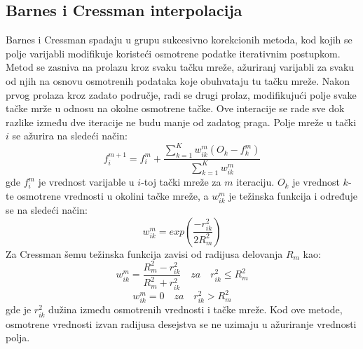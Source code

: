 \documentclass[12pt]{article}
\begin{document}
 
\subsection{Barnes i Cressman interpolacija}
Barnes i Cressman spadaju u grupu sukcesivno korekcionih metoda, kod kojih se polje varijabli modifikuje koristeći osmotrene podatke iterativnim postupkom. Metod se zasniva na prolazu kroz svaku tačku mreže, ažuriranj varijabli za svaku od njih na osnovu osmotrenih podataka koje obuhvataju tu tačku mreže. Nakon prvog prolaza kroz zadato područje, radi se drugi prolaz, modifikujući polje svake tačke mrže u odnosu na okolne osmotrene tačke. Ove interacije se rade sve dok razlike između dve iteracije ne budu manje od zadatog praga.  
Polje mreže u tački $i$ se ažurira na sledeći način:
\begin{equation}
f_{i}^{m+1}=f_{i}^{m}+\frac{\sum_{k=1}^{K}w_{ik}^{m}(O_{k}-f_{k}^{m})}{\sum_{k=1}^{K}w_{ik}^{m}}
\end{equation}
gde $f_{i}^m$ je vrednost varijable u $i$-toj tački mreže za $m$ iteraciju. $O_k$ je vrednost $k$-te osmotrene vrednosti u okolini tačke mreže, a $w_{ik}^m$ je težinska funkcija i određuje se na sledeći način:
\begin{equation}
w_{ik}^m = exp(\frac{-r_{ik}^{2}}{2R_{m}^2})
\end{equation}
Za Cressman šemu težinska funkcija zavisi od radijusa delovanja $R_m$ kao:
\begin{equation}\label{key}
w_{ik}^m = \frac{R_{m}^{2}-r_{ik}^2}{R_{m}^{2}+r_{ik}^2}\quad za \quad r_{ik}^{2}\leq R_{m}^2
\end{equation}
\begin{equation}\label{key}
w_{ik}^{m}=0 \quad za \quad r_{ik}^{2}> R_{m}^2
\end{equation}
gde je $r_{ik}^2$ dužina između osmotrenih vrednosti i tačke mreže. Kod ove metode, osmotrene vrednosti izvan radijusa desejstva se ne uzimaju u ažuriranje vrednosti polja. 
\end{document}
